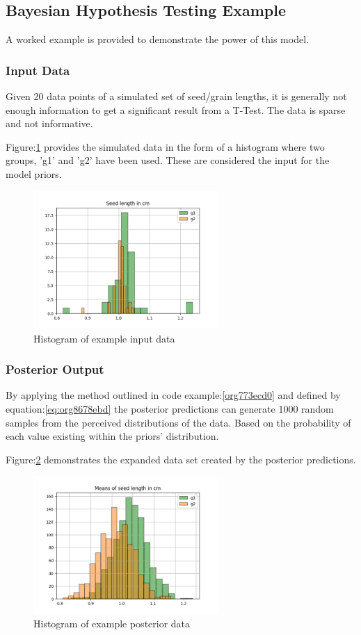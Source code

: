 \documentclass[11pt]{report}
\begin{document}
\subsection{Bayesian Hypothesis Testing Example}
\label{sec:org1cf9fbb}
A worked example is provided to demonstrate the power of this model.
\subsubsection{Input Data}
\label{sec:orga594355}
Given 20 data points of a simulated set of seed/grain lengths, it is generally not enough information to get a significant result from a T-Test. The data is sparse and not informative.

Figure:\ref{fig:orgeb3531b} provides the simulated data in the form of a histogram where two groups, 'g1' and 'g2' have been used. These are considered the input for the model priors.
\begin{figure}[htbp]
\centering
\includegraphics[width=7cm]{./images/exampledata.png}
\caption{\label{fig:orgeb3531b}
Histogram of example input data}
\end{figure}

\subsubsection{Posterior Output}
\label{sec:org3a4586e}
By applying the method outlined in code example:\ref{org773ecd0} and defined by equation:\ref{eq:org8678ebd} the posterior predictions can generate 1000 random samples from the perceived distributions of the data. Based on the probability of each value existing within the priors' distribution.

Figure:\ref{fig:org6dd6a52} demonstrates the expanded data set created by the posterior predictions.
\begin{figure}[htbp]
\centering
\includegraphics[width=7cm]{./images/examplebayes.png}
\caption{\label{fig:org6dd6a52}
Histogram of example posterior data}
\end{figure}
\end{document}
